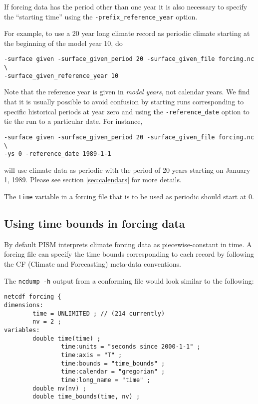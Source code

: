\documentclass[titlepage,letterpaper,final]{scrartcl}
\begin{document}
If forcing data has the period other than one year it is also
necessary to specify the ``starting time'' using the
\texttt{-prefix_reference_year} option.

For example, to use a 20 year long climate record as periodic climate starting
at the beginning of the model year 10, do
\begin{verbatim}
-surface given -surface_given_period 20 -surface_given_file forcing.nc \
-surface_given_reference_year 10
\end{verbatim}

Note that the reference year is given in \emph{model years}, not calendar
years. We find that it is usually possible to avoid confusion by starting runs
corresponding to specific historical periods at year zero and using the
\texttt{-reference_date} option to tie the run to a particular date. For instance,
\begin{verbatim}
-surface given -surface_given_period 20 -surface_given_file forcing.nc \
-ys 0 -reference_date 1989-1-1
\end{verbatim}
will use climate data as periodic with the period of 20 years starting on
January 1, 1989. Please see section \ref{sec:calendars} for more details.

The \texttt{time} variable in a forcing file that is to be used as periodic
should start at $0$.

\subsection{Using time bounds in forcing data}
\label{sec:time-bounds}

By default PISM interprets climate forcing data as piecewise-constant in
time. A forcing file can specify the time bounds corresponding to each record
by following the CF (Climate and Forecasting) meta-data conventions.

The \texttt{ncdump -h} output from a conforming file would look similar to the
following:
\begin{verbatim}
netcdf forcing {
dimensions:
        time = UNLIMITED ; // (214 currently)
        nv = 2 ;
variables:
        double time(time) ;
                time:units = "seconds since 2000-1-1" ;
                time:axis = "T" ;
                time:bounds = "time_bounds" ;
                time:calendar = "gregorian" ;
                time:long_name = "time" ;
        double nv(nv) ;
        double time_bounds(time, nv) ;
\end{verbatim}
\end{document}
